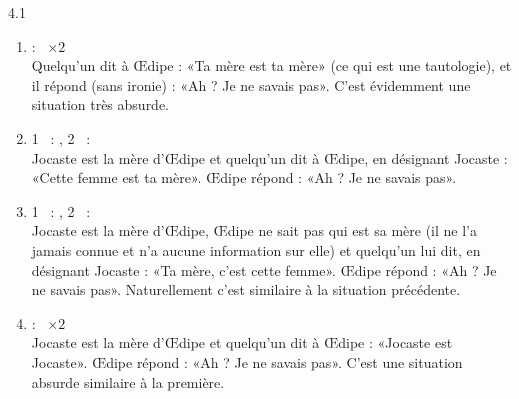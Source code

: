 \begin{Solution}{4.{1}}
\begin{enumerate}
\begin{enumerate}
\item  {} : \dedicto\ $\times 2$\\
Quelqu'un dit à \OE dipe : «Ta mère est ta mère» (ce qui est une tautologie), et il répond (sans ironie)  : «Ah ? Je ne savais pas».  C'est évidemment une situation très absurde.

\item 1\ier\  : \dere, 2\ieme\  : \dedicto\\
Jocaste est la mère d'\OE dipe et quelqu'un dit à \OE dipe, en désignant Jocaste : «Cette femme est ta mère».  \OE dipe répond : «Ah ? Je ne savais pas».

\item 1\ier\  : \dedicto, 2\ieme\  : \dere\\
Jocaste est la mère d'\OE dipe, \OE dipe ne sait pas qui est sa mère (il ne l'a jamais connue et n'a aucune information sur elle) et quelqu'un lui dit, en désignant Jocaste : «Ta mère, c'est cette femme».  \OE dipe répond : «Ah ? Je ne savais pas».  Naturellement c'est similaire à la situation précédente.

\item  {} : \dere\ $\times 2$\\
Jocaste est la mère d'\OE dipe et quelqu'un dit à \OE dipe : «Jocaste est Jocaste».   \OE dipe répond : «Ah ? Je ne savais pas».  C'est une situation absurde similaire à la première.

\end{enumerate}

\end{enumerate}
\end{Solution}
